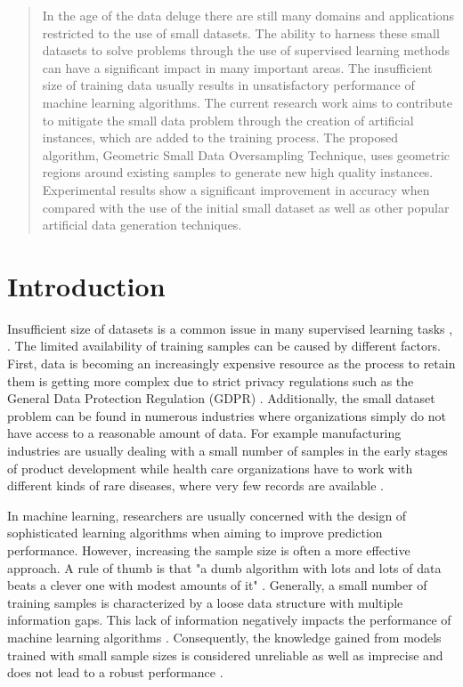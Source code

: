 \begin{abstract}
In the age of the data deluge there are still many domains and applications restricted to the use of small datasets. The ability to harness these small datasets to solve problems through the use of supervised learning methods can have a significant impact in many important areas. The insufficient size of training data usually results in unsatisfactory performance of machine learning algorithms. The current research work aims to contribute to mitigate the small data problem through the creation of artificial instances, which are added to the training process. The proposed algorithm, Geometric Small Data Oversampling Technique, uses geometric regions around existing samples to generate new high quality instances. Experimental results show a significant improvement in accuracy when compared with the use of the initial small dataset as well as other popular artificial data generation techniques.
\end{abstract}

\section{Introduction}
Insufficient size of datasets is a common issue in many supervised learning tasks \cite{Niyogi.1998}, \cite{AbdulLateh.2017}. The limited availability of training samples can be caused by different factors. First, data is becoming an increasingly expensive resource \cite{Li.2007} as the process to retain them is getting more complex due to strict privacy regulations such as the General Data Protection Regulation (GDPR) \cite{EuropeanCommission.2019}. Additionally, the small dataset problem can be found in numerous industries where organizations simply do not have access to a reasonable amount of data. For example manufacturing industries are usually dealing with a small number of samples in the early stages of product development while health care organizations have to work with different kinds of rare diseases, where very few records are available \cite{AbdulLateh.2017}.

In machine learning, researchers are usually concerned with the design of sophisticated learning algorithms when aiming to improve prediction performance. However, increasing the sample size is often a more effective approach. A rule of thumb is that "a dumb algorithm with lots and lots of data beats a clever one with modest amounts of it" \cite{Domingos.2012}. Generally, a small number of training samples is characterized by a loose data structure with multiple information gaps. This lack of information negatively impacts the performance of machine learning algorithms \cite{Lin.2018}. Consequently, the knowledge gained from models trained with small sample sizes is considered unreliable as well as imprecise and does not lead to a robust performance \cite{AbdulLateh.2017}.

